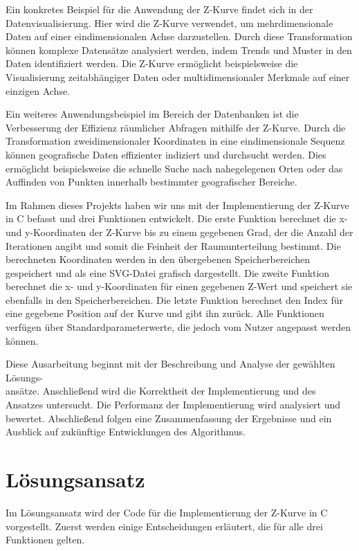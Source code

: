 \documentclass[course=erap]{aspdoc}
\begin{document}
\noindent Ein konkretes Beispiel für die Anwendung der Z-Kurve findet sich in der Datenvisualisierung. Hier wird die Z-Kurve verwendet, um mehrdimensionale Daten auf einer eindimensionalen Achse darzustellen. Durch diese Transformation können komplexe Datensätze analysiert werden, indem Trends und Muster in den Daten identifiziert werden. Die Z-Kurve ermöglicht beispielsweise die Visualisierung zeitabhängiger Daten oder multidimensionaler Merkmale auf einer einzigen Achse.
\setlength{\parskip}{1em}

\noindent Ein weiteres Anwendungsbeispiel im Bereich der Datenbanken ist die Verbesserung der Effizienz räumlicher Abfragen mithilfe der Z-Kurve. Durch die Transformation zweidimensionaler Koordinaten in eine eindimensionale Sequenz können geografische Daten effizienter indiziert und durchsucht werden. Dies ermöglicht beispielsweise die schnelle Suche nach nahegelegenen Orten oder das Auffinden von Punkten innerhalb bestimmter geografischer Bereiche.
\setlength{\parskip}{1em}

\noindent Im Rahmen dieses Projekts haben wir uns mit der Implementierung der Z-Kurve in C befasst und drei Funktionen entwickelt. Die erste Funktion berechnet die x- und y-Koordinaten der Z-Kurve bis zu einem gegebenen Grad, der die Anzahl der Iterationen angibt und somit die Feinheit der Raumunterteilung bestimmt. Die berechneten Koordinaten werden in den übergebenen Speicherbereichen gespeichert und als eine SVG-Datei grafisch dargestellt. Die zweite Funktion berechnet die x- und y-Koordinaten für einen gegebenen Z-Wert und speichert sie ebenfalls in den Speicherbereichen. Die letzte Funktion berechnet den Index für eine gegebene Position auf der Kurve und gibt ihn zurück. Alle Funktionen verfügen über Standardparameterwerte, die jedoch vom Nutzer angepasst werden können.
\setlength{\parskip}{1em}

\noindent Diese Ausarbeitung beginnt mit der Beschreibung und Analyse der gewählten 
Lösungs-\\ansätze. Anschließend wird die Korrektheit der Implementierung und des Ansatzes untersucht. Die Performanz der Implementierung wird analysiert und bewertet. Abschließend folgen eine Zusammenfassung der Ergebnisse und ein Ausblick auf zukünftige Entwicklungen des Algorithmus.
\setlength{\parskip}{1em}




\section{Lösungsansatz}
\setlength{\parskip}{1em}
\noindent Im Lösungsansatz wird der Code für die Implementierung der Z-Kurve in C vorgestellt. Zuerst werden einige Entscheidungen erläutert, die für alle drei Funktionen gelten.
\setlength{\parskip}{1em}
\end{document}
